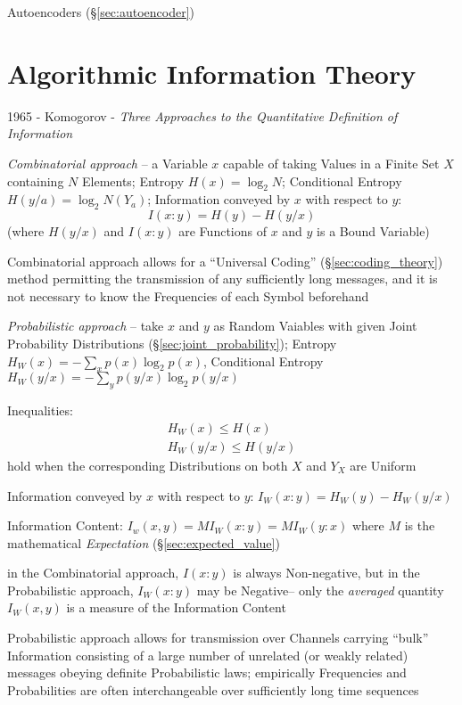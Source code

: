 \fist Autoencoders (\S\ref{sec:autoencoder})



\section{Algorithmic Information Theory}\label{sec:algorithmic_information}

1965 - Komogorov - \emph{Three Approaches to the Quantitative Definition of
  Information}

\emph{Combinatorial approach} -- a Variable $x$ capable of taking Values in a
Finite Set $X$ containing $N$ Elements; Entropy $H(x) = \log_2 N$; Conditional
Entropy $H(y/a) = \log_2 N(Y_a)$; Information conveyed by $x$ with respect to
$y$:
\[
  I(x:y) = H(y) - H(y/x)
\]
(where $H(y/x)$ and $I(x : y)$ are Functions of $x$ and $y$ is a Bound Variable)

Combinatorial approach allows for a ``Universal Coding''
(\S\ref{sec:coding_theory}) method permitting the transmission of any
sufficiently long messages, and it is not necessary to know the Frequencies of
each Symbol beforehand

\emph{Probabilistic approach} -- take $x$ and $y$ as Random Vaiables with given
Joint Probability Distributions (\S\ref{sec:joint_probability}); Entropy
$H_W(x) = -\sum_x p(x) \log_2 p(x)$, Conditional Entropy
$H_W(y/x) = -\sum_y p(y/x) \log_2 p(y/x)$

Inequalities:
\begin{align*}
  H_W(x) \leq H(x) \\
  H_W(y/x) \leq H(y/x)
\end{align*}
hold when the corresponding Distributions on both $X$ and $Y_X$ are Uniform

Information conveyed by $x$ with respect to $y$: $I_W(x:y) = H_W(y) - H_W(y/x)$

Information Content: $I_w(x,y) = MI_W(x : y) = MI_W(y : x)$ where $M$ is the
mathematical \emph{Expectation} (\S\ref{sec:expected_value})

in the Combinatorial approach, $I(x:y)$ is always Non-negative, but in the
Probabilistic approach, $I_W(x:y)$ may be Negative-- only the \emph{averaged}
quantity $I_W(x,y)$ is a measure of the Information Content

Probabilistic approach allows for transmission over Channels carrying ``bulk''
Information consisting of a large number of unrelated (or weakly related)
messages obeying definite Probabilistic laws; empirically Frequencies and
Probabilities are often interchangeable over sufficiently long time sequences

